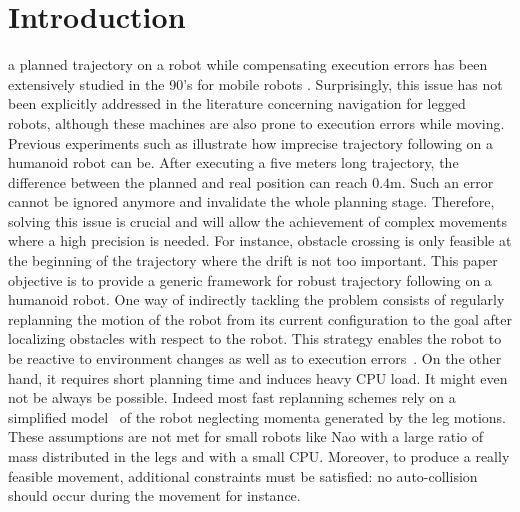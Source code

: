 \section{Introduction}
%
 a planned trajectory on a robot while
compensating execution errors has been extensively studied in the 90's
for mobile robots \cite{91icra.samson,
  98deLucaOrioloSamson}. Surprisingly, this issue has not been
explicitly addressed in the literature concerning navigation for
legged robots, although these machines are also prone to execution
errors while moving.
%
Previous experiments such as \cite{11humanoids.baudouin} illustrate
how imprecise trajectory following on a humanoid robot can be. After
executing a five meters long trajectory, the difference between the
planned and real position can reach $0.4 \textrm{m}$. Such an error
cannot be ignored anymore and invalidate the whole planning
stage. Therefore, solving this issue is crucial and will allow the
achievement of complex movements where a high precision is needed. For
instance, obstacle crossing is only feasible at the beginning of the
trajectory where the drift is not too important. This paper objective
is to provide a generic framework for robust trajectory following on a
humanoid robot.
%
One way of indirectly tackling the problem consists of regularly
replanning the motion of the robot from its current configuration to
the goal after localizing obstacles with respect to the robot. This
strategy enables the robot to be reactive to environment changes as
well as to execution errors~\cite{05humanoids.michel,
  06icra.MichelChestnut,10springer.chestnut}. On the other hand, it
requires short planning time and induces heavy CPU load. It might even
not be always be possible. Indeed most fast replanning schemes rely on
a simplified model~\cite{01icra.KajitaKanehiro} of the robot
neglecting momenta generated by the leg motions. These assumptions are
not met for small robots like Nao with a large %
ratio of mass distributed in the legs and with a small CPU.
%
Moreover, to produce a really feasible movement, additional
constraints must be satisfied: no auto-collision should occur during
the movement for instance.
%
%
